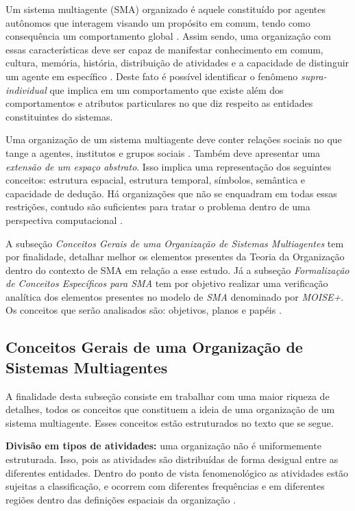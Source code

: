 Um sistema multiagente (SMA) organizado é aquele constituído por agentes autônomos que interagem visando um propósito em comum, tendo como consequência um comportamento global \cite{moiseframework,organiationofmultiagentsystem}. Assim sendo, uma organização com essas características deve ser capaz de manifestar conhecimento em comum, cultura, memória, história, distribuição de atividades e a capacidade de distinguir um  agente em específico \cite{organiationofmultiagentsystem}. Deste fato é possível identificar o fenômeno \textit{supra-individual} que implica em um comportamento que existe além dos comportamentos e atributos particulares no que diz respeito as entidades constituintes do sistemas. 

Uma organização de um sistema multiagente deve conter relações sociais no que tange a agentes, institutos e grupos sociais \cite{organiationofmultiagentsystem}. Também deve apresentar uma \textit{extensão de um espaço abstrato}. Isso implica uma representação dos seguintes conceitos: estrutura espacial, estrutura temporal, símbolos, semântica e capacidade de dedução. Há organizações que não se enquadram em todas essas restrições, contudo são suficientes para tratar o problema dentro de uma perspectiva computacional \cite{organiationofmultiagentsystem}.

A subseção \textit{Conceitos Gerais de uma Organização de Sistemas Multiagentes} tem por finalidade, detalhar melhor os elementos presentes da Teoria da Organização dentro do contexto de SMA em relação a esse estudo. Já a subseção \textit{Formalização de Conceitos Específicos para SMA} tem por objetivo realizar uma verificação analítica dos elementos presentes no modelo de \textit{SMA} denominado por \textit{MOISE+}. Os conceitos que serão analisados são: objetivos, planos e papéis \cite{organiationofmultiagentsystem}.
   

\subsection{Conceitos Gerais de uma Organização de Sistemas Multiagentes}

A finalidade desta subseção consiste em trabalhar com uma maior riqueza de detalhes, todos os conceitos que constituem a ideia de uma organização de um sistema multiagente. Esses conceitos estão estruturados no texto que se segue.
  
\textbf{Divisão em tipos de atividades:} uma organização não é uniformemente estruturada. Isso, pois as atividades são distribuídas de forma desigual entre as diferentes entidades. Dentro do ponto de vista fenomenológico as atividades estão sujeitas a classificação, e ocorrem com diferentes frequências e em diferentes regiões dentro das definições espaciais da organização \cite{organiationofmultiagentsystem}.

